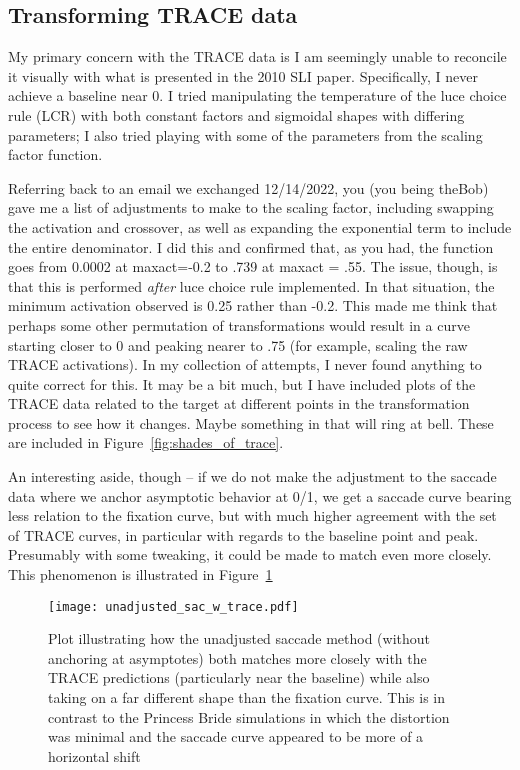 \subsection{Transforming TRACE data}


My primary concern with the TRACE data is I am seemingly unable to reconcile it visually with what is presented in the 2010 SLI paper. Specifically, I never achieve a baseline near 0. I tried manipulating the temperature of the luce choice rule (LCR) with both constant factors and sigmoidal shapes with differing parameters; I also tried playing with some of the parameters from the scaling factor function.


Referring back to an email we exchanged 12/14/2022, you (you being theBob) gave me a list of adjustments to make to the scaling factor, including swapping the activation and crossover, as well as expanding the exponential term to include the entire denominator. I did this and confirmed that, as you had, the function goes from 0.0002 at maxact=-0.2 to .739 at maxact = .55. The issue, though, is that this is performed \textit{after} luce choice rule implemented. In that situation, the minimum activation observed is 0.25 rather than -0.2. This made me think that perhaps some other permutation of transformations would result in a curve starting closer to 0 and peaking nearer to .75 (for example, scaling the raw TRACE activations). In my collection of attempts, I never found anything to quite correct for this. It may be a bit much, but I have included plots of the TRACE data related to the target at different points in the transformation process to see how it changes. Maybe something in that will ring at bell. These are included in  Figure~\ref{fig:shades_of_trace}. 


An interesting aside, though -- if we do not make the adjustment to the saccade data where we anchor asymptotic behavior at 0/1, we get a saccade curve bearing less relation to the fixation curve, but with much higher agreement with the set of TRACE curves, in particular with regards to the baseline point and peak. Presumably with some tweaking, it could be made to match even more closely. This phenomenon is illustrated in Figure~\ref{fig:unadjusted_saccade_against_trace}

\begin{figure}[H]
  \centering
  \texttt{[image: unadjusted\_sac\_w\_trace.pdf]}
  \caption{Plot illustrating how the unadjusted saccade method (without anchoring at asymptotes) both matches more closely with the TRACE predictions (particularly near the baseline) while also taking on a far different shape than the fixation curve. This is in contrast to the Princess Bride simulations in which the distortion was minimal and the saccade curve appeared to be more of a horizontal shift}
  \label{fig:unadjusted_saccade_against_trace}
\end{figure}


